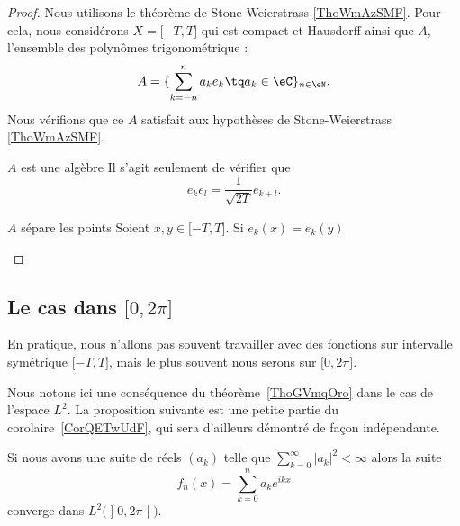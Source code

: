 \begin{proof}
    Nous utilisons le théorème de Stone-Weierstrass \ref{ThoWmAzSMF}. Pour cela, nous considérons \( X=\mathopen[ -T , T \mathclose]\) qui est compact et Hausdorff ainsi que \( A\), l'ensemble des polynômes trigonométrique :
    \begin{equation}
        A=\{ \sum_{k=-n}^na_ke_k\tq a_k\in \eC \}_{n\in \eN}.
    \end{equation}
    Nous vérifions que ce \( A\) satisfait aux hypothèses de Stone-Weierstrass \ref{ThoWmAzSMF}.
    \begin{subproof}
        \item[\( A\) est une algèbre]
            Il s'agit seulement de vérifier que
            \begin{equation}
                e_ke_l=\frac{1}{ \sqrt{ 2T } }e_{k+l}.
            \end{equation}
        \item[\( A\) sépare les points]
            Soient \( x,y\in \mathopen[ -T , T \mathclose]\). Si \( e_k(x)=e_k(y)\)
    \end{subproof}
\end{proof}

\subsection{Le cas dans \( \mathopen[ 0 , 2\pi \mathclose]\)}

En pratique, nous n'allons pas souvent travailler avec des fonctions sur intervalle symétrique \( \mathopen[ -T , T \mathclose]\), mais le plus souvent nous serons sur \( \mathopen[ 0 , 2\pi \mathclose]\).

Nous notons ici une conséquence du théorème~\ref{ThoGVmqOro} dans le cas de l'espace \( L^2\). La proposition suivante est une petite partie du corolaire~\ref{CorQETwUdF}, qui sera d'ailleurs démontré de façon indépendante.

\begin{proposition}
    Si nous avons une suite de réels \( (a_k)\) telle que \( \sum_{k=0}^{\infty}| a_k |^2<\infty\) alors la suite
    \begin{equation}
        f_n(x)=\sum_{k=0}^na_k e^{ikx}
    \end{equation}
    converge dans \( L^2\big( \mathopen] 0 , 2\pi \mathclose[ \big)\).
\end{proposition}

